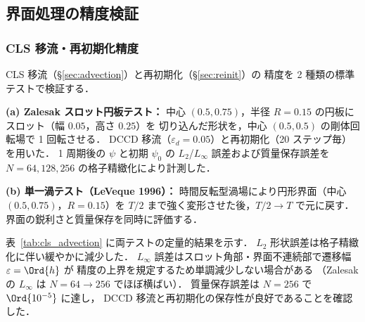 %
\subsection{界面処理の精度検証}
\label{sec:verify_interface}

\subsubsection{CLS 移流・再初期化精度}
\label{sec:verify_cls_advection}

CLS 移流（§\ref{sec:advection}）と再初期化（§\ref{sec:reinit}）の
精度を 2 種類の標準テストで検証する．

\textbf{(a) Zalesak スロット円板テスト：}
中心 $(0.5, 0.75)$，半径 $R = 0.15$ の円板にスロット（幅 $0.05$，高さ $0.25$）を
切り込んだ形状を，中心 $(0.5, 0.5)$ の剛体回転場で 1 回転させる．
DCCD 移流（$\varepsilon_d = 0.05$）と再初期化（20 ステップ毎）を用いた．
1 周期後の $\psi$ と初期 $\psi_0$ の $L_2$/$L_\infty$ 誤差および質量保存誤差を
$N = 64, 128, 256$ の格子精緻化により計測した．

\textbf{(b) 単一渦テスト（LeVeque 1996）：}
時間反転型渦場により円形界面（中心 $(0.5, 0.75)$，$R = 0.15$）を
$T/2$ まで強く変形させた後，$T/2 \to T$ で元に戻す．
界面の鋭利さと質量保存を同時に評価する．

表~\ref{tab:cls_advection} に両テストの定量的結果を示す．
$L_2$ 形状誤差は格子精緻化に伴い緩やかに減少した．
$L_\infty$ 誤差はスロット角部・界面不連続部で遷移幅 $\varepsilon = \Ord{h}$ が
精度の上界を規定するため単調減少しない場合がある
（Zalesak の $L_\infty$ は $N=64\to256$ でほぼ横ばい）．
質量保存誤差は $N = 256$ で $\Ord{10^{-5}}$ に達し，
DCCD 移流と再初期化の保存性が良好であることを確認した．


